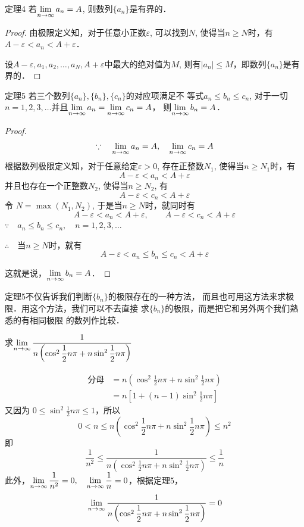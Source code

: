 \begin{blk}{定理4}
    若$\displaystyle\lim_{n\to\infty}a_n=A$, 则数列$\{a_n\}$是有界的．
\end{blk}    

\begin{proof}
由极限定义知，对于任意小正数$\varepsilon$, 可以找到$N$,
使得当$n\ge N$时，有
$A-\varepsilon<a_n<A+\varepsilon$．

设$A-\varepsilon,a_1,a_2,\ldots,a_N,A+\varepsilon$中最大的绝对值为$M$, 
则有$|a_n|\le M$，即数列$\{a_n\}$是有界的．
\end{proof}

\begin{blk}{定理5}
    若三个数列$\{a_n\},\{b_n\},\{c_n\}$的对应项满足不
等式$a_n\le b_n\le c_n$, 对于一切$n=1,2,3,\ldots$并且$\displaystyle\lim_{n\to\infty}a_n=\displaystyle\lim_{n\to\infty}c_n=A$，
则$\displaystyle\lim_{n\to\infty}b_n=A$．
\end{blk}

\begin{proof}
\[\because\quad \displaystyle\lim_{n\to\infty}a_n=A,\quad \displaystyle\lim_{n\to\infty}c_n=A\]
根据数列极限定义知，对于任意给定$\varepsilon >0$, 存在正整数$N_1$,
使得当$n\ge N_1$时，有
\[A-\varepsilon <a_n<A+\varepsilon\] 
并且也存在一个正整数$N_2$, 使得当$n\ge N_2$, 有
\[A-\varepsilon <c_n<A+\varepsilon\]
令 $N=\max(N_1,N_2)$, 于是当$n\ge N$时，就同时有
\[A-\varepsilon <a_n<A+\varepsilon ,\qquad A-\varepsilon <c_n<A+\varepsilon \]
$\because\quad a_n\le b_n\le c_n,\quad n=1,2,3,\ldots$

$\therefore\quad $当$n\ge N$时，就有
\[A-\varepsilon <a_n\le b_n\le c_n<A+\varepsilon\]

这就是说，$\displaystyle\lim_{n\to\infty}b_n=A$．
\end{proof}

定理5不仅告诉我们判断$\{b_n\}$的极限存在的一种方法，
而且也可用这方法来求极限．用这个方法，我们可以不去直接
求$\{b_n\}$的极限，而是把它和另外两个我们熟悉的有相同极限
的数列作比较．

\begin{example}
    求$\displaystyle\lim_{n\to\infty}\dfrac{1}{n\left(\cos^2\dfrac{1}{2}n\pi+n\sin^2\dfrac{1}{2}n\pi\right)}$
\end{example}

\begin{solution}
\[\begin{split}
    \text{分母}&=n\left(\cos^2\frac{1}{2}n\pi+n\sin^2\frac{1}{2}n\pi\right)\\
    &=n\left[1+(n-1)\sin^2\frac{1}{2}n\pi\right]
\end{split}\]
又因为 $0\le \sin^2\frac{1}{2}n\pi\le 1$，所以
\[0<n\le n\left(\cos^2\frac{1}{2}n\pi+n\sin^2\frac{1}{2}n\pi\right)\le n^2\]
即
\[\frac{1}{n^2}\le \frac{1}{n\left(\cos^2\frac{1}{2}n\pi+n\sin^2\frac{1}{2}n\pi\right)}\le \frac{1}{n}\]
此外，$\displaystyle\lim_{n\to\infty}\dfrac{1}{n^2}=0,\quad \displaystyle\lim_{n\to\infty}\dfrac{1}{n}=0$，根据定理5，
\[\displaystyle\lim_{n\to\infty}\dfrac{1}{n\left(\cos^2\dfrac{1}{2}n\pi+n\sin^2\dfrac{1}{2}n\pi\right)}=0\]
\end{solution}



